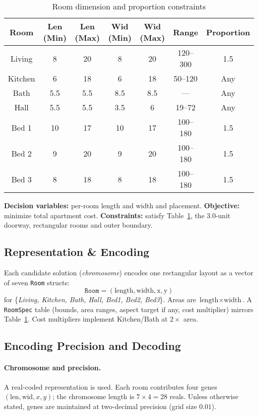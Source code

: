 \documentclass{article}
\begin{document}
\begin{table}[H]
\centering
\caption{Room dimension and proportion constraints}
\label{tab:floorplan_constraints}
\begin{tabular}{|c|c|c|c|c|c|c|}
\hline
\textbf{Room} & \textbf{Len (Min)} & \textbf{Len (Max)} & \textbf{Wid (Min)} & \textbf{Wid (Max)} & \textbf{Range} & \textbf{Proportion} \\ \hline
Living  & 8  & 20  & 8  & 20  & 120--300 & 1.5 \\ \hline
Kitchen & 6  & 18  & 6  & 18  & 50--120  & Any \\ \hline
Bath    & 5.5 & 5.5 & 8.5 & 8.5 & ---      & Any \\ \hline
Hall    & 5.5 & 5.5 & 3.5 & 6   & 19--72   & Any \\ \hline
Bed 1   & 10 & 17  & 10 & 17  & 100--180 & 1.5 \\ \hline
Bed 2   & 9  & 20  & 9  & 20  & 100--180 & 1.5 \\ \hline
Bed 3   & 8  & 18  & 8  & 18  & 100--180 & 1.5 \\ \hline
\end{tabular}
\end{table}

\noindent\textbf{Decision variables:} per-room length and width and placement. \quad
\textbf{Objective:} minimize total apartment cost. \quad
\textbf{Constraints:} satisfy Table~\ref{tab:floorplan_constraints}, the 3.0-unit doorway, rectangular rooms and outer boundary.

\subsection{Representation \& Encoding}
Each candidate solution (\emph{chromosome}) encodes one rectangular layout as a vector of seven \texttt{Room} structs:
\[
\texttt{Room} = (\text{length}, \text{width}, \text{x}, \text{y})
\]
for \{\textit{Living, Kitchen, Bath, Hall, Bed1, Bed2, Bed3}\}. Areas are $\text{length}\times\text{width}$. A \texttt{RoomSpec} table (bounds, area ranges, aspect target if any, cost multiplier) mirrors Table~\ref{tab:floorplan_constraints}. Cost multipliers implement Kitchen/Bath at $2\times$ area.

\subsection{Encoding Precision and Decoding}
\paragraph{Chromosome and precision.}
A real-coded representation is used. Each room contributes four genes $(\text{len},\text{wid},x,y)$; the chromosome length is $7\times4=28$ reals. Unless otherwise stated, genes are maintained at two-decimal precision (grid size $0.01$).
\end{document}
